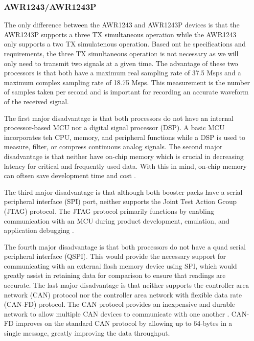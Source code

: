 \documentclass[11pt]{IEEEtran}
\begin{document}
			\subsubsection{AWR1243/AWR1243P}
				The only difference between the AWR1243 and AWR1243P devices \cite{awr1243,awr1243boost} is that the AWR1243P supports a three TX simultaneous operation while the AWR1243 only supports a two TX simulatenous operation. Based ont he specifications and requirements, the three TX simultaneous operation is not necessary as we will only need to transmit two signals at a given time. The advantage of these two processors is that both have a maximum real sampling rate of 37.5 Msps and a maximum complex sampling rate of 18.75 Msps. This measurement is the number of samples taken per second and is important for recording an accurate waveform of the received signal.

				The first major disadvantage is that both processors do not have an internal processor-based MCU nor a digital signal processor (DSP). A basic MCU incorporates teh CPU, memory, and peripheral functions while a DSP is used to measure, filter, or compress continuous analog signals. The second major disadvantage is that neither have on-chip memory which is crucial in decreasing latency for critical and frequently used data. With this in mind, on-chip memory can oftsen save development time and cost \cite{memory}.

				The third major disadvantage is that although both booster packs have a serial peripheral interface (SPI) port, neither supports the Joint Test Action Group (JTAG) protocol. The JTAG protocol primarily functions by enabling communication with an MCU during product development, emulation, and application debugging \cite{jtag}.

				The fourth major disadvantage is that both processors do not have a quad serial peripheral interface (QSPI). This would provide the necessary support for communicating with an external flash memory device using SPI, which would greatly assist in retaining data for comparison to ensure that readings are accurate. The last major disadvantage is that neither supports the controller area network (CAN) protocol nor the controller area network with flexible data rate (CAN-FD) protocol. The CAN protocol provides an inexpensive and durable network to allow multiple CAN devices to communicate with one another \cite{iso11898}. CAN-FD improves on the standard CAN protocol by allowing up to 64-bytes in a single message, greatly improving the data throughput. 
\end{document}

